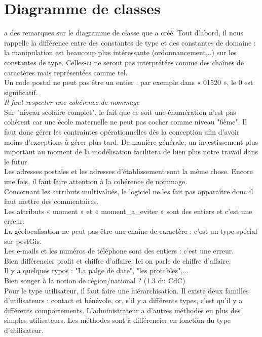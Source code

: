 \documentclass [a4paper] {article}
\begin{document}
\section{Diagramme de classes}
\nomTuteurPedago{} a des remarques sur le diagramme de classe que \Julie{} a créé. Tout d'abord, il nous rappelle la différence entre des constantes de type et des constantes de domaine : la manipulation est beaucoup plus intéressante (ordonnancement,..) sur les constantes de type. Celles-ci ne seront pas interprétées comme des chaînes de caractères mais représentées comme tel. \\
Un code postal ne peut pas être un entier : par exemple dans « 01520 », le 0 est significatif. \\
\emph{Il faut respecter une cohérence de nommage} \\
Sur "niveau scolaire complet", le fait que ce soit une énumération n'est pas cohérent car une école maternelle ne peut pas cocher comme niveau "6ème". Il faut donc gérer les contraintes opérationnelles dès la conception afin d'avoir moins d'exceptions à gérer plus tard. De manière générale, un investissement plus important au moment de la modélisation facilitera de bien plus notre travail dans le futur. \\
Les adresses postales et les adresses d’établissement sont la même chose. Encore une fois, il faut faire attention à la cohérence de nommage.\\
Concernant les attributs multivalués, le logiciel ne les fait pas apparaître donc il faut mettre des commentaires.\\
Les attributs « moment » et « moment\_a\_eviter » sont des entiers et c'est une erreur. \\
La géolocalisation ne peut pas être une chaîne de caractère : c'est un type spécial sur postGis.\\
Les e-mails et les numéros de téléphone sont des entiers : c'est une erreur.\\
Bien différencier profit et chiffre d'affaire. Ici on parle de chiffre d'affaire.\\
Il y a quelques typos : "La palge de date", "les protables",...\\
Bien songer à la notion de région/national ? (1.3 du CdC) \\
Pour le type utilisateur, il faut faire une hiérarchisation. Il existe deux familles d'utilisateurs : contact et bénévole, or, s'il y a différents types, c'est qu'il y a différents comportements. L'administrateur a d'autres méthodes en plus des simples utilisateurs. Les méthodes sont à différencier en fonction du type d'utilisateur.\\
\end{document}
